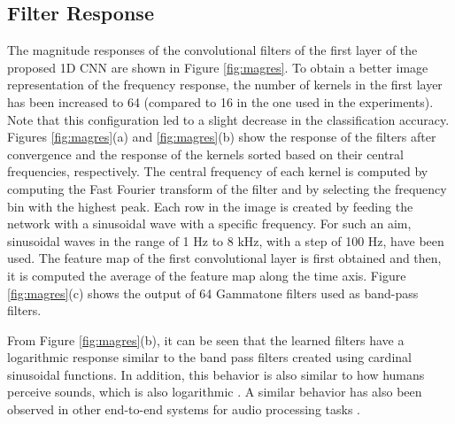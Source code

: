 \documentclass[preprint,final,12pt]{elsarticle}
\begin{document}
\subsection{Filter Response}
\label{sec:filred}
The magnitude responses of the convolutional filters of the first layer of the proposed 1D CNN are shown in Figure \ref{fig:magres}. To obtain a better image representation of the frequency response, the number of kernels in the first layer has been increased to 64 (compared to 16 in the one used in the experiments). Note that this configuration led to a slight decrease in the classification accuracy. Figures \ref{fig:magres}(a) and \ref{fig:magres}(b) show the response of the filters after convergence and the response of the kernels sorted based on their central frequencies, respectively. The central frequency of each kernel is computed by computing the Fast Fourier transform of the filter and by selecting the frequency bin with the highest peak. Each row in the image is created by feeding the network with a sinusoidal wave with a specific frequency. For such an aim, sinusoidal waves in the range of 1 Hz to 8 kHz, with a step of 100 Hz, have been used. The feature map of the first convolutional layer is first obtained and then, it is computed the average of the feature map along the time axis. Figure \ref{fig:magres}(c) shows the output of 64 Gammatone filters used as band-pass filters.

\begin{figure*}[htpb!]\centering
{}\caption{Magnitude response of the convolutional filters of the first layer of the end-to-end 1D CNN: (a) response of the filters after convergence; (b) response of the kernels after sorting based on their central frequency; (c) frequency response of band pass filters. Center frequency of filters are selected according to constant  transform rules \citep{brown1991calculation}.}
\label{fig:magres}
\end{figure*}

From Figure \ref{fig:magres}(b), it can be seen that the learned filters have a logarithmic response similar to the band pass filters created using cardinal sinusoidal functions. In addition, this behavior is also similar to how humans perceive sounds, which is also logarithmic \citep{roederer2008physics}. A similar behavior has also been observed in other end-to-end systems for audio processing tasks \citep{hoshen2015speech, sainath2015learning, tokozumeENV}.
\end{document}
